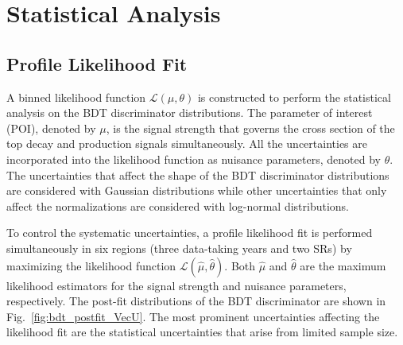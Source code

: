 \chapter{Statistical Analysis}
\label{chap:Results}


\section{Profile Likelihood Fit}
\label{sec:PLF}

A binned likelihood function $\mathcal{L}(\mu, \theta)$ is constructed to perform the statistical analysis on the BDT discriminator distributions. The parameter of interest (POI), denoted by $\mu$, is the signal strength that governs the cross section of the top decay and production signals simultaneously. All the uncertainties are incorporated into the likelihood function as nuisance parameters, denoted by $\theta$. The uncertainties that affect the shape of the BDT discriminator distributions are considered with Gaussian distributions while other uncertainties that only affect the normalizations are considered with log-normal distributions. 

To control the systematic uncertainties, a profile likelihood fit is performed simultaneously in six regions (three data-taking years and two \acp{SR}) by maximizing the likelihood function $\mathcal{L}(\hat{\mu}, \hat{\theta})$. Both $\hat{\mu}$ and $\hat{\theta}$ are the maximum likelihood estimators for the signal strength and nuisance parameters, respectively. The post-fit distributions of the BDT discriminator are shown in Fig.~\ref{fig:bdt_postfit_VecU}. The most prominent uncertainties affecting the likelihood fit are the statistical uncertainties that arise from limited sample size.

